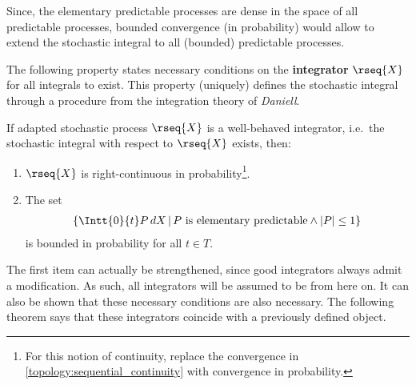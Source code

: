     Since, the elementary predictable processes are dense in the space of all predictable processes, bounded convergence (in probability) would allow to extend the stochastic integral to all (bounded) predictable processes.

    The following property states necessary conditions on the \textbf{integrator} $\rseq{X}$ for all integrals to exist. This property (uniquely) defines the stochastic integral through a procedure from the integration theory of \textit{Daniell}.
    \begin{property}
        If adapted stochastic process $\rseq{X}$ is a well-behaved integrator, i.e.~the stochastic integral with respect to $\rseq{X}$ exists, then:
        \begin{enumerate}
            \item $\rseq{X}$ is right-continuous in probability\footnote{For this notion of continuity, replace the convergence in \cref{topology:sequential_continuity} with convergence in probability.}.
            \item The set
            \begin{gather}
                \label{stoch:bounded_elementary_set}
                \left\{\Intt{0}{t}P\,dX\,\middle\vert\, P\text{ is elementary predictable}\land|P|\leq1\right\}
            \end{gather}
            is bounded in probability for all $t\in T$.
        \end{enumerate}
    \end{property}
    The first item can actually be strengthened, since good integrators always admit a \cdlg modification. As such, all integrators will be assumed to be \cdlg from here on. It can also be shown that these necessary conditions are also necessary. The following theorem says that these integrators coincide with a previously defined object.

